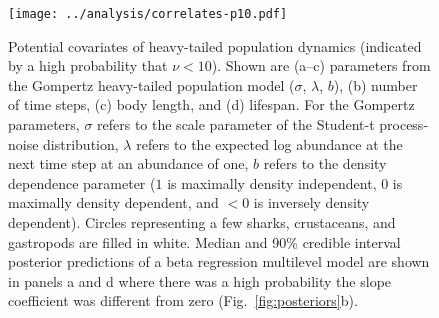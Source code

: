 \begin{figure}[htbp]
\begin{center}
\texttt{[image: ../analysis/correlates-p10.pdf]}

\caption[Potential covariates of heavy-tailed population dynamics (indicated
  by a high probability that $\nu < 10$).]{Potential covariates of heavy-tailed population dynamics (indicated
  by a high probability that $\nu < 10$). Shown are (a--c) parameters from the
  Gompertz heavy-tailed population model ($\sigma$, $\lambda$, $b$), (b)
  number of time steps, (c) body length, and (d) lifespan. For the Gompertz
  parameters, $\sigma$ refers to the scale parameter of the Student-t
  process-noise distribution, $\lambda$ refers to the expected log abundance
  at the next time step at an abundance of one, $b$ refers to the density
  dependence parameter ($1$ is maximally density independent, $0$ is maximally
  density dependent, and $<0$ is inversely density dependent). Circles
  representing a few sharks, crustaceans, and gastropods are filled in white.
  Median and 90\% credible interval posterior predictions of a beta regression
  multilevel model are shown in panels a and d where there was a high
  probability the slope coefficient was different from zero
  (Fig.~\ref{fig:posteriors}b).}

\label{fig:correlates}
\end{center}
\end{figure}

